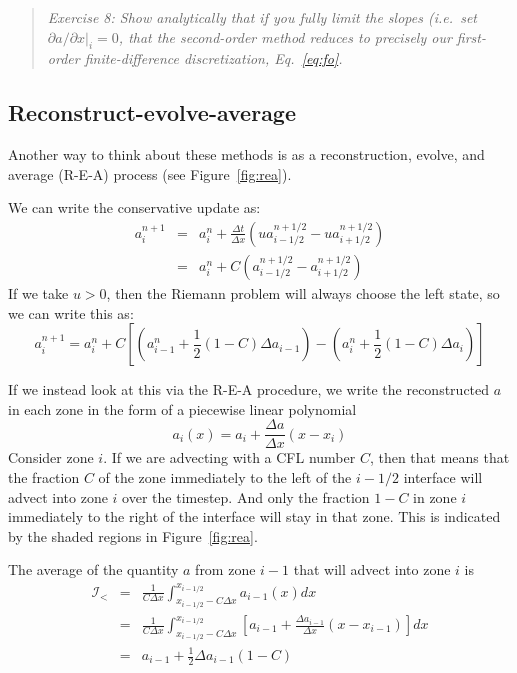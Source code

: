 \documentclass[11pt]{article}
\begin{document}
\begin{quote}
{\em Exercise 8: Show analytically that if you fully limit the slopes
  (i.e.\ set $\partial a/\partial x |_i = 0$, that the second-order
  method reduces to precisely our first-order finite-difference discretization,
  Eq.~\ref{eq:fo}.  }
\end{quote}


\subsection{Reconstruct-evolve-average}

Another way to think about these methods is as a reconstruction,
evolve, and average (R-E-A) process (see Figure~\ref{fig:rea}).  

We can write the conservative update as:
\begin{eqnarray}
a_i^{n+1} &=& a_i^n + \frac{\Delta t}{\Delta x} 
    (u a^{n+1/2}_{i-1/2} - u a^{n+1/2}_{i+1/2} ) \\
          &=& a_i^n + C (a^{n+1/2}_{i-1/2} - a^{n+1/2}_{i+1/2} ) 
\end{eqnarray}
If we take $u > 0$, then the Riemann problem will always choose the
left state, so we can write this as:
\begin{equation}
a_i^{n+1} = a_i^n + 
     C \left [\left (a_{i-1}^n + \frac{1}{2} (1-C) \Delta a_{i-1} \right ) -
              \left (a_{i}^n + \frac{1}{2} (1-C) \Delta a_{i} \right ) 
       \right ] \label{eq:rea_orig}
\end{equation}

If we instead look at this via the R-E-A procedure, we write the reconstructed
$a$ in each zone in the form of a piecewise linear polynomial
\begin{equation}
a_i(x) = a_i + \frac{\Delta a}{\Delta x} (x - x_i)
\end{equation}
Consider zone $i$.  
If we are advecting with a CFL number $C$, then that means that the fraction
$C$ of the zone immediately to the left of the $i-1/2$ interface will advect
into zone $i$ over the timestep.  And only the fraction $1-C$ in zone $i$
immediately to the right of the interface will stay in that zone.  This 
is indicated by the shaded regions in Figure~\ref{fig:rea}. 

The average of the quantity $a$ from zone $i-1$ that will advect into
zone $i$ is 
\begin{eqnarray}
\mathcal{I}_< &=& \frac{1}{C \Delta x} 
   \int_{x_{i-1/2} - C\Delta x}^{x_{i-1/2}} a_{i-1}(x) dx \\
%
 &=& \frac{1}{C \Delta x} 
   \int_{x_{i-1/2} - C\Delta x}^{x_{i-1/2}}
        \left [ a_{i-1} + \frac{\Delta a_{i-1}}{\Delta x} (x - x_{i-1} ) \right ] dx  \\
 &=& a_{i-1} + \frac{1}{2} \Delta a_{i-1} (1-C)
\end{eqnarray}
\end{document}
